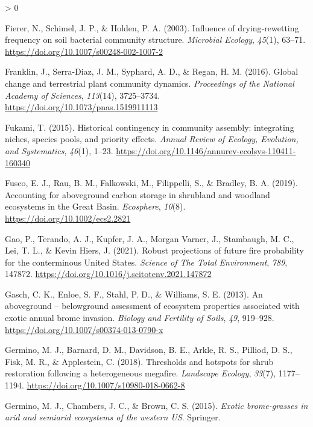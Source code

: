 \documentclass[
  11pt,
  a4paper,
]{article}
\newlength{\cslhangindent}
\newenvironment{CSLReferences}[2] %
 {%
  \setlength{\parindent}{0pt}
  \ifodd #1 \everypar{\setlength{\hangindent}{\cslhangindent}}\ignorespaces\fi
  \ifnum #2 > 0
  \setlength{\parskip}{#2\baselineskip}
  \fi
 }%
 {}
\begin{document}
\begin{CSLReferences}{1}{0}
\leavevmode\hypertarget{ref-Fierer2003}{}%
Fierer, N., Schimel, J. P., \& Holden, P. A. (2003). Influence of {drying}-{rewetting} {frequency} on {soil} {bacterial} {community} {structure}. \emph{Microbial Ecology}, \emph{45}(1), 63--71. \url{https://doi.org/10.1007/s00248-002-1007-2}

\leavevmode\hypertarget{ref-Franklin2016}{}%
Franklin, J., Serra-Diaz, J. M., Syphard, A. D., \& Regan, H. M. (2016). {Global change and terrestrial plant community dynamics}. \emph{Proceedings of the National Academy of Sciences}, \emph{113}(14), 3725--3734. \url{https://doi.org/10.1073/pnas.1519911113}

\leavevmode\hypertarget{ref-Fukami2015}{}%
Fukami, T. (2015). {Historical contingency in community assembly: integrating niches, species pools, and priority effects}. \emph{Annual Review of Ecology, Evolution, and Systematics}, \emph{46}(1), 1--23. \url{https://doi.org/10.1146/annurev-ecolsys-110411-160340}

\leavevmode\hypertarget{ref-Fusco2019}{}%
Fusco, E. J., Rau, B. M., Falkowski, M., Filippelli, S., \& Bradley, B. A. (2019). Accounting for aboveground carbon storage in shrubland and woodland ecosystems in the {Great} {Basin}. \emph{Ecosphere}, \emph{10}(8). \url{https://doi.org/10.1002/ecs2.2821}

\leavevmode\hypertarget{ref-Gao2021}{}%
Gao, P., Terando, A. J., Kupfer, J. A., Morgan Varner, J., Stambaugh, M. C., Lei, T. L., \& Kevin Hiers, J. (2021). Robust projections of future fire probability for the conterminous {United} {States}. \emph{Science of The Total Environment}, \emph{789}, 147872. \url{https://doi.org/10.1016/j.scitotenv.2021.147872}

\leavevmode\hypertarget{ref-Gasch2013}{}%
Gasch, C. K., Enloe, S. F., Stahl, P. D., \& Williams, S. E. (2013). {An aboveground -- belowground assessment of ecosystem properties associated with exotic annual brome invasion}. \emph{Biology and Fertility of Soils}, \emph{49}, 919--928. \url{https://doi.org/10.1007/s00374-013-0790-x}

\leavevmode\hypertarget{ref-Germino2018}{}%
Germino, M. J., Barnard, D. M., Davidson, B. E., Arkle, R. S., Pilliod, D. S., Fisk, M. R., \& Applestein, C. (2018). {Thresholds and hotspots for shrub restoration following a heterogeneous megafire}. \emph{Landscape Ecology}, \emph{33}(7), 1177--1194. \url{https://doi.org/10.1007/s10980-018-0662-8}

\leavevmode\hypertarget{ref-Germino2016}{}%
Germino, M. J., Chambers, J. C., \& Brown, C. S. (2015). \emph{Exotic brome-grasses in arid and semiarid ecosystems of the western US}. Springer.


\end{CSLReferences}
\end{document}
